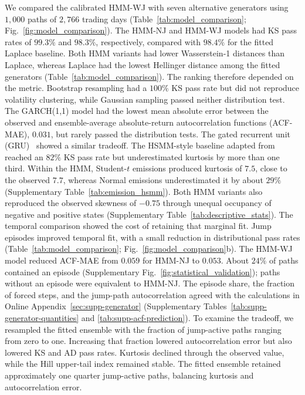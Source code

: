 We compared the calibrated HMM-WJ with seven alternative generators
using $1{,}000$ paths of $2{,}766$ trading days
(Table~\ref{tab:model_comparison}; Fig.~\ref{fig:model_comparison}).
The HMM-NJ and HMM-WJ models had KS pass rates of $99.3\%$ and
$98.3\%$, respectively, compared with $98.4\%$ for the fitted
Laplace baseline. Both HMM variants had lower Wasserstein-1 distances
than Laplace, whereas Laplace had the lowest Hellinger distance among
the fitted generators (Table~\ref{tab:model_comparison}). The
ranking therefore depended on the metric. Bootstrap resampling had a
$100\%$ KS pass rate but did not reproduce volatility clustering,
while Gaussian sampling passed neither distribution test.
The GARCH(1,1) model had the lowest mean absolute error between the
observed and ensemble-average absolute-return autocorrelation
functions (ACF-MAE), $0.031$, but rarely passed the distribution
tests. The gated recurrent unit (GRU)~\cite{choEtAl2014gru}
showed a similar tradeoff. The HSMM-style baseline adapted from \citet{bullaBulla2006} reached an $82\%$ KS pass rate but
underestimated kurtosis by more than one third. Within the HMM,
Student-$t$ emissions produced kurtosis of $7.5$, close to the
observed $7.7$, whereas Normal emissions underestimated it by about
$29\%$ (Supplementary Table~\ref{tab:emission_hsmm}). Both HMM variants also
reproduced the observed skewness of $-0.75$ through unequal occupancy
of negative and positive states (Supplementary Table~\ref{tab:descriptive_stats}).
The temporal comparison showed the cost of retaining that marginal fit.
Jump episodes improved temporal fit, with a small reduction in
distributional pass rates (Table~\ref{tab:model_comparison};
Fig.~\ref{fig:model_comparison}b). The HMM-WJ model reduced ACF-MAE from
$0.059$ for HMM-NJ to $0.053$. About $24\%$ of paths contained an
episode (Supplementary Fig.~\ref{fig:statistical_validation}); paths without an
episode were equivalent to HMM-NJ. The
episode share, the fraction of forced steps, and the jump-path
autocorrelation agreed with the calculations in Online
Appendix~\ref{sec:supp-generator}
(Supplementary Tables~\ref{tab:supp-generator-quantities} and
\ref{tab:supp-acf-prediction}). To examine the tradeoff, we
resampled the fitted ensemble with the fraction of jump-active paths
ranging from zero to one. Increasing that fraction lowered
autocorrelation error but also lowered KS and AD pass rates.
Kurtosis declined through the observed value, while the Hill
upper-tail index remained stable. The fitted ensemble retained approximately one quarter jump-active
paths, balancing kurtosis and autocorrelation error.
